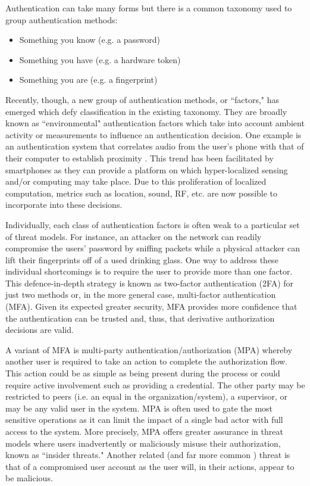 \documentclass[letterpaper, 10 pt, conference]{ieeeconf}
\begin{document}
  Authentication can take many forms but there is a common taxonomy used to group authentication methods:
  \begin{itemize}
      \item Something you know (e.g. a password)
      \item Something you have (e.g. a hardware token)
      \item Something you are (e.g. a fingerprint)
  \end{itemize}
  
  Recently, though, a new group of authentication methods, or ``factors," has emerged which defy classification in the existing taxonomy.
  They are broadly known as ``environmental" authentication factors which take into account ambient activity or measurements to influence an authentication decision.
  One example is an authentication system that correlates audio from the user's phone with that of their computer to establish proximity \cite{ambient}.
  This trend has been facilitated by smartphones as they can provide a platform on which hyper-localized sensing and/or computing may take place.
  Due to this proliferation of localized computation, metrics such as location, sound, RF, etc. are now possible to incorporate into these decisions.

  Individually, each class of authentication factors is often weak to a particular set of threat models.
  For instance, an attacker on the network can readily compromise the users' password by sniffing packets while a physical attacker can lift their fingerprints off of a used drinking glass.
  One way to address these individual shortcomings is to require the user to provide more than one factor.
  This defence-in-depth strategy is known as two-factor authentication (2FA) for just two methods or, in the more general case, multi-factor authentication (MFA).
  Given its expected greater security, MFA provides more confidence that the authentication can be trusted and, thus, that derivative authorization decisions are valid.

  A variant of MFA is multi-party authentication/authorization (MPA) whereby another user is required to take an action to complete the authorization flow.
  This action could be as simple as being present during the process or could require active involvement such as providing a credential.
  The other party may be restricted to peers (i.e. an equal in the organization/system), a supervisor, or may be any valid user in the system.
  MPA is often used to gate the most sensitive operations as it can limit the impact of a single bad actor with full access to the system.
  More precisely, MPA offers greater assurance in threat models where users inadvertently or maliciously misuse their authorization, known as ``insider threats."
  Another related (and far more common \cite{insider}) threat is that of a compromised user account as the user will, in their actions, appear to be malicious.
\end{document}
